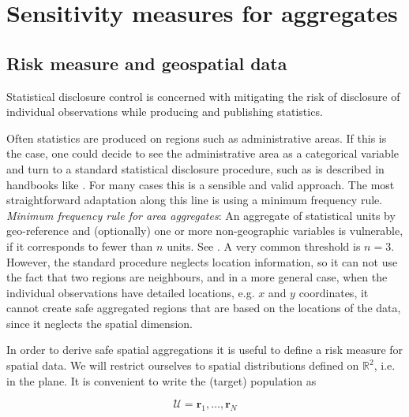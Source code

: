 \section{Sensitivity measures for aggregates} \label{sec:risk_aggr}

\subsection{Risk measure and geospatial data} \label{sec:risk_aggr_geosp}

Statistical disclosure control is concerned with mitigating the risk of disclosure
of individual observations while producing and publishing statistics.

Often statistics are produced on regions such as administrative areas. If this is 
the case, one could decide to see the administrative area as a categorical variable 
and turn to a standard statistical disclosure procedure, such as is described in handbooks like \citet{HundepoolEtAl2024}. For many cases this is a sensible and valid approach. The most straightforward adaptation along this line is using a minimum frequency rule.\\

\textit{Minimum frequency rule for area aggregates}: An aggregate of statistical units by geo-reference and (optionally) one or more non-geographic variables is vulnerable, if it corresponds to fewer than $n$ units. See \citet[4.2.1]{HundepoolEtAl2024}. A very common threshold is $n = 3$.\\

However, the standard procedure neglects location information, so it can not use the fact that two regions are neighbours, and in a more general case, when the individual observations have
detailed locations, e.g. $x$ and $y$ coordinates, it cannot create safe aggregated 
regions that are based on the locations of the data, since it neglects the spatial 
dimension. 

In order to derive safe spatial aggregations it is useful to define a risk measure for 
spatial data. We will restrict ourselves to spatial distributions defined on $\mathbb{R}^2$, i.e. in the plane. It 
is convenient
to write the (target) population as 

$$\mathcal{U} = {\mathbf{r}_1, \ldots, \mathbf{r}_N }$$

